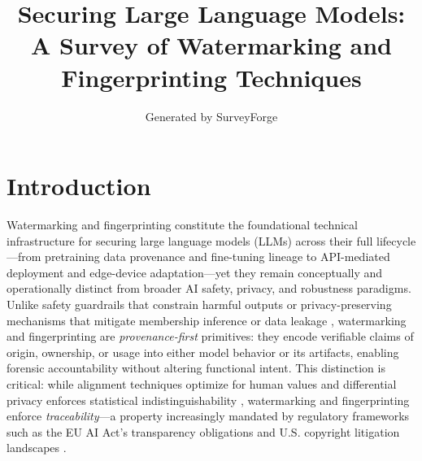 \documentclass[11pt,a4paper]{article}
\title{Securing Large Language Models: A Survey of Watermarking and Fingerprinting Techniques}
\author{Generated by SurveyForge}
\date{}
\begin{document}
\maketitle
\tableofcontents
\newpage



\section{Introduction}


Watermarking and fingerprinting constitute the foundational technical infrastructure for securing large language models (LLMs) across their full lifecycle---from pretraining data provenance and fine-tuning lineage to API-mediated deployment and edge-device adaptation---yet they remain conceptually and operationally distinct from broader AI safety, privacy, and robustness paradigms. Unlike safety guardrails that constrain harmful outputs \cite{doi:10.55662/jst.2023.4605} or privacy-preserving mechanisms that mitigate membership inference or data leakage \cite{doi:10.3390/info15110697,doi:10.1007/s44443-025-00177-1}, watermarking and fingerprinting are \emph{provenance-first} primitives: they encode verifiable claims of origin, ownership, or usage into either model behavior or its artifacts, enabling forensic accountability without altering functional intent. This distinction is critical: while alignment techniques optimize for human values \cite{arxiv:2309.15025} and differential privacy enforces statistical indistinguishability \cite{doi:10.1007/s10462-024-11024-6}, watermarking and fingerprinting enforce \emph{traceability}---a property increasingly mandated by regulatory frameworks such as the EU AI Act's transparency obligations and U.S. copyright litigation landscapes \cite{arxiv:2405.01560}.
\end{document}

